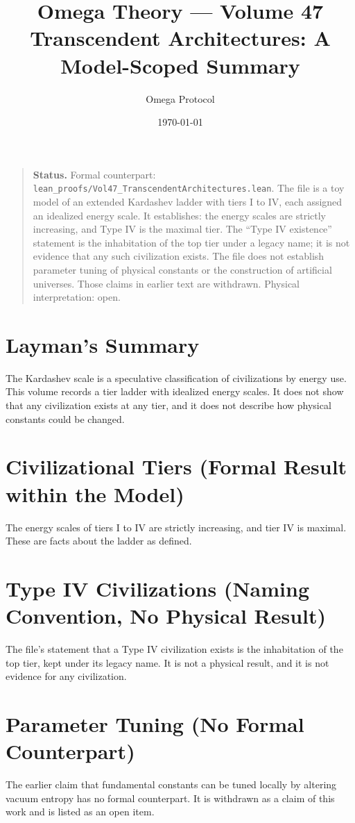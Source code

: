 \documentclass[11pt, a4paper]{article}
\title{Omega Theory --- Volume 47\\\Large Transcendent Architectures: A Model-Scoped Summary}
\author{Omega Protocol}
\date{\today}
\begin{document}
\maketitle

\begin{quote}
\textbf{Status.} Formal counterpart: \texttt{lean\_proofs/Vol47\_TranscendentArchitectures.lean}. The file is a toy model of an extended Kardashev ladder with tiers I to IV, each assigned an idealized energy scale. It establishes: the energy scales are strictly increasing, and Type IV is the maximal tier. The ``Type IV existence'' statement is the inhabitation of the top tier under a legacy name; it is not evidence that any such civilization exists. The file does not establish parameter tuning of physical constants or the construction of artificial universes. Those claims in earlier text are withdrawn. Physical interpretation: open.
\end{quote}

\section*{Layman's Summary}
The Kardashev scale is a speculative classification of civilizations by energy use. This volume records a tier ladder with idealized energy scales. It does not show that any civilization exists at any tier, and it does not describe how physical constants could be changed.

\section{Civilizational Tiers (Formal Result within the Model)}
The energy scales of tiers I to IV are strictly increasing, and tier IV is maximal. These are facts about the ladder as defined.

\section{Type IV Civilizations (Naming Convention, No Physical Result)}
The file's statement that a Type IV civilization exists is the inhabitation of the top tier, kept under its legacy name. It is not a physical result, and it is not evidence for any civilization.

\section{Parameter Tuning (No Formal Counterpart)}
The earlier claim that fundamental constants can be tuned locally by altering vacuum entropy has no formal counterpart. It is withdrawn as a claim of this work and is listed as an open item.
\end{document}
